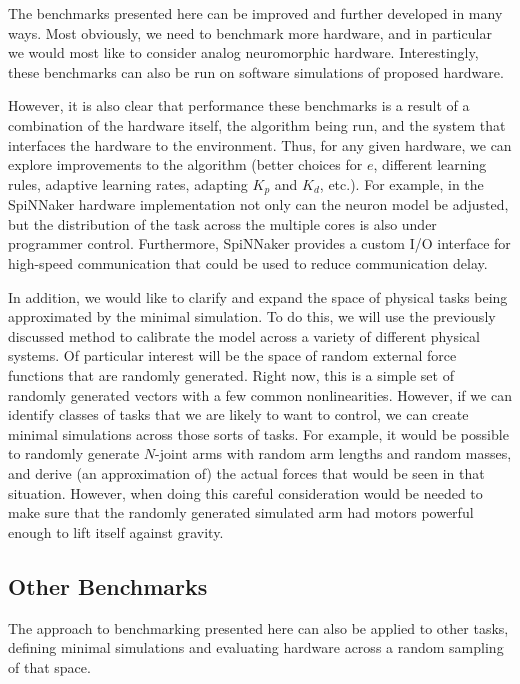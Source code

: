 \documentclass{frontiersSCNS} %
\begin{document}
The benchmarks presented here can be improved and further developed in many
ways.  Most obviously, we need to benchmark more hardware, and in particular
we would most like to consider analog neuromorphic hardware.  Interestingly, these
benchmarks can also be run on software simulations of proposed hardware.

However, it is also clear that performance these benchmarks is a result of
a combination of the hardware itself, the algorithm being run, and the system that
interfaces the hardware to the environment.  Thus, for any given hardware, 
we can explore improvements to the algorithm (better choices for $e$, 
different learning rules, adaptive learning rates, adapting $K_p$ and $K_d$, etc.).
For example, in the SpiNNaker hardware implementation not only can the neuron model
be adjusted, but the distribution of the task across the multiple cores is also
under programmer control.  Furthermore, SpiNNaker provides a custom I/O interface
for high-speed communication that could be used to reduce communication delay.

In addition, we would like to clarify and expand the space of physical tasks
being approximated by the minimal simulation.  To do this, we will use the
previously discussed method to 
calibrate the model across a variety of different physical systems.  Of
particular interest will be the space of random external force functions that
are randomly generated.  Right now, this is a simple set of randomly
generated vectors with a few common nonlinearities.  However, if we can
identify classes of tasks that we are likely to want to control, we can
create minimal simulations across those sorts of tasks.  For example, it
would be possible to randomly generate $N$-joint arms with random arm
lengths and random masses, and derive (an approximation of) the actual forces 
that would be seen in that situation.  However, when doing this careful
consideration would be needed to make sure that the randomly generated simulated arm
had motors powerful enough to lift itself against gravity.

\subsection{Other Benchmarks}

The approach to benchmarking presented here can also be applied to other tasks,
defining minimal simulations and evaluating hardware across a random sampling
of that space.  
\end{document}
